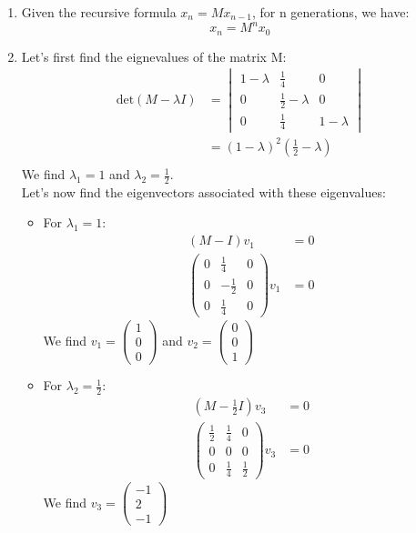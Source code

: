 \documentclass[11pt, legalpaper]{article}
\begin{document}
\begin{enumerate}
    \item Given the recursive formula $x_n=Mx_{n-1}$, for n generations, we have:
        $$\boxed{x_n=M^nx_{0}}$$
    \item Let's first find the eignevalues of the matrix M:
    \begin{align*}\text{det}(M-\lambda I) & =\begin{vmatrix}
        1-\lambda & \frac{1}{4} & 0 \\
        0 & \frac{1}{2}-\lambda & 0 \\
        0 & \frac{1}{4} & 1-\lambda
    \end{vmatrix}\\
    &=(1-\lambda)^2\left(\frac{1}{2}-\lambda\right)\\ \end{align*}
    We find $\lambda_1=1$ and $\lambda_2=\frac{1}{2}$.\\
    Let's now find the eigenvectors associated with these eigenvalues:
    \begin{itemize}
        \item For $\lambda_1=1$:
        \begin{align*}
            (M-I)v_1 & =0\\
            \begin{pmatrix}
                0 & \frac{1}{4} & 0 \\
                0 & -\frac{1}{2} & 0 \\
                0 & \frac{1}{4} & 0
            \end{pmatrix}v_1 & =0
        \end{align*}
        We find $v_1=\begin{pmatrix} 1 \\ 0 \\ 0 \end{pmatrix}$ and $v_2=\begin{pmatrix} 0 \\ 0 \\ 1 \end{pmatrix}$
        \item For $\lambda_2=\frac{1}{2}$:
        \begin{align*}
            \left(M-\frac{1}{2}I\right)v_3 & =0\\
            \begin{pmatrix}
                \frac{1}{2} & \frac{1}{4} & 0 \\
                0 & 0 & 0 \\
                0 & \frac{1}{4} & \frac{1}{2}
            \end{pmatrix}v_3 & =0
        \end{align*}
        We find $v_3=\begin{pmatrix} -1 \\ 2 \\ -1 \end{pmatrix}$
    \end{itemize}


\end{enumerate}
\end{document}
